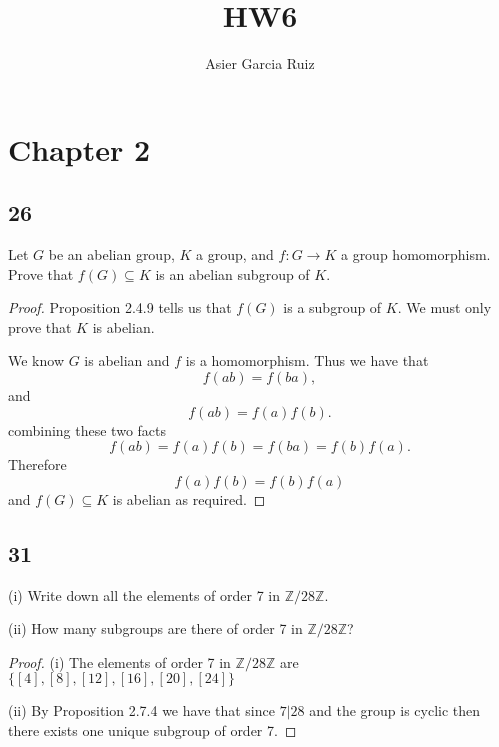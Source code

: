 \documentclass{article}
\title{HW6}
\author{Asier Garcia Ruiz}
\newcommand{\Z}{\mathbb{Z}}
\newenvironment{hwproof}[1]
{
    #1
    \begin{proof}
}{
    \end{proof}
}
\begin{document}
\maketitle

\section*{Chapter 2}
\subsection*{26}
\begin{hwproof}
    {
        Let $G$ be an abelian group, $K$ a group, and $f: G \to K$ a group homomorphism.
        Prove that $f(G) \subseteq K$ is an abelian subgroup of $K$.
    }

    Proposition 2.4.9 tells us that $f(G)$ is a subgroup of $K$. We must only
    prove that $K$ is abelian.

    We know $G$ is abelian and $f$ is a homomorphism. Thus we have that
    \begin{equation*}
        f(ab) = f(ba),
    \end{equation*}
    and
    \begin{equation*}
        f(ab) = f(a)f(b).
    \end{equation*}
    combining these two facts
    \begin{equation*}
        f(ab) = f(a)f(b) = f(ba) = f(b)f(a).
    \end{equation*}
    Therefore
    \begin{equation*}
        f(a)f(b) = f(b)f(a)
    \end{equation*}
    and $f(G) \subseteq K$ is abelian as required.
\end{hwproof}

\subsection*{31}
\begin{hwproof}
    {
        (i) Write down all the elements of order 7 in $\Z / 28\Z$.

        (ii) How many subgroups are there of order 7 in $\Z / 28\Z$?
    }
    (i) The elements of order 7 in $\Z / 28\Z$ are
    $\{[4], [8], [12], [16], [20], [24]\}$

    (ii) By Proposition 2.7.4 we have that since $7|28$ and the group is cyclic
    then there exists one unique subgroup of order 7.
\end{hwproof}
\end{document}
